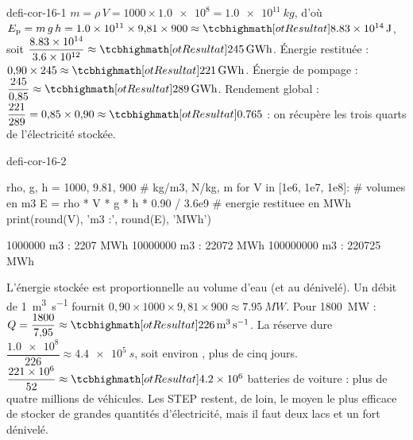 \begin{blocEdition}{defi-cor-16-1}
$m=\rho\,V=1000\times\num{1,0e8}=\qty{1,0e11}{kg}$, d'où $E_\mathrm{p}=m\,g\,h=\num{1,0e11}\times9{,}81\times900\approx\res{\qty{8,83e14}{J}}$, soit $\dfrac{\num{8,83e14}}{\num{3,6e12}}\approx\res{\qty{245}{GWh}}$.
Énergie restituée : $0{,}90\times245\approx\res{\qty{221}{GWh}}$. Énergie de pompage : $\dfrac{245}{0{,}85}\approx\res{\qty{289}{GWh}}$. Rendement global :
$\dfrac{221}{289}=0{,}85\times0{,}90\approx\res{\num{0,765}}$ : on récupère les trois quarts de l'électricité stockée.
\label{figedition-defi-cor-16-1-1}
\end{blocEdition}

\begin{blocEdition}{defi-cor-16-2}
\begin{python}
rho, g, h = 1000, 9.81, 900          # kg/m3, N/kg, m
for V in [1e6, 1e7, 1e8]:            # volumes en m3
    E = rho * V * g * h * 0.90 / 3.6e9   # energie restituee en MWh
    print(round(V), 'm3 :', round(E), 'MWh')
\end{python}
\begin{console}
1000000 m3 : 2207 MWh
10000000 m3 : 22072 MWh
100000000 m3 : 220725 MWh
\end{console}
L'énergie stockée est proportionnelle au volume d'eau (et au dénivelé).
Un débit de \qty{1}{m^3.s^{-1}} fournit $0{,}90\times1000\times9{,}81\times900\approx\qty{7,95}{MW}$. Pour \qty{1800}{MW} : $Q=\dfrac{1800}{7{,}95}\approx\res{\qty{226}{m^3.s^{-1}}}$. La réserve
dure $\dfrac{\num{1,0e8}}{226}\approx\qty{4,4e5}{s}$, soit environ , plus de cinq jours.
$\dfrac{\num{221e6}}{52}\approx\res{\num{4,2e6}}$ batteries de voiture : plus de quatre millions de véhicules. Les STEP restent, de loin, le moyen le plus
efficace de stocker de grandes quantités d'électricité, mais il faut deux lacs et un fort dénivelé.
\end{blocEdition}

